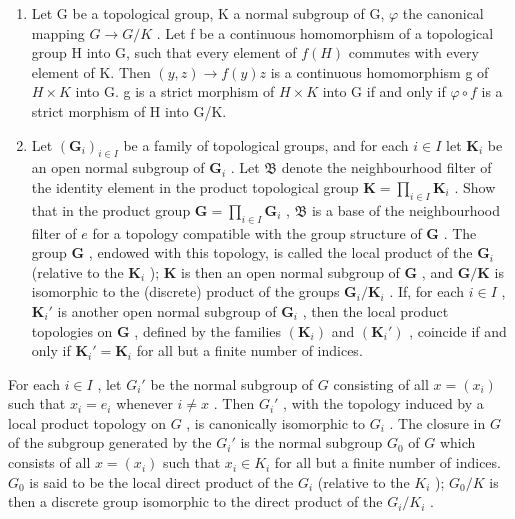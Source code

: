 \begin{enumerate}
\def\labelenumi{\arabic{enumi})}
\setcounter{enumi}{24}
\item
  Let G be a topological group, K a normal subgroup of G, \(\varphi\) the canonical mapping \(G \rightarrow G/K\) . Let f be a continuous homomorphism of a topological group H into G, such that every element of \(f(H)\) commutes with every element of K. Then \((y, z) \rightarrow f(y)z\) is a continuous homomorphism g of \(H \times K\) into G. g is a strict morphism of \(H \times K\) into G if and only if \(\varphi \circ f\) is a strict morphism of H into G/K.
\item
  Let \((\mathbf{G}_i)_{i\in I}\) be a family of topological groups, and for each \(i\in I\) let \(\mathbf{K}_i\) be an open normal subgroup of \(\mathbf{G}_i\) . Let \(\mathfrak{B}\) denote the neighbourhood filter of the identity element in the product topological group \(\mathbf{K} = \prod_{i\in I}\mathbf{K}_i\) . Show that in the product group \(\mathbf{G} = \prod_{i\in I}\mathbf{G}_i\) , \(\mathfrak{B}\) is a base of the neighbourhood filter of \(e\) for a topology compatible with the group structure of \(\mathbf{G}\) . The group \(\mathbf{G}\) , endowed with this topology, is called the local product of the \(\mathbf{G}_i\) (relative to the \(\mathbf{K}_i\) ); \(\mathbf{K}\) is then an open normal subgroup of \(\mathbf{G}\) , and \(\mathbf{G} / \mathbf{K}\) is isomorphic to the (discrete) product of the groups \(\mathbf{G}_i / \mathbf{K}_i\) . If, for each \(i\in I\) , \(\mathbf{K}_i'\) is another open normal subgroup of \(\mathbf{G}_i\) , then the local product topologies on \(\mathbf{G}\) , defined by the families \((\mathbf{K}_i)\) and \((\mathbf{K}_i')\) , coincide if and only if \(\mathbf{K}_i' = \mathbf{K}_i\) for all but a finite number of indices.
\end{enumerate}

For each \(i \in I\) , let \(G_i'\) be the normal subgroup of \(G\) consisting of all \(x = (x_i)\) such that \(x_i = e_i\) whenever \(i \neq x\) . Then \(G_i'\) , with the topology induced by a local product topology on \(G\) , is canonically isomorphic to \(G_i\) . The closure in \(G\) of the subgroup generated by the \(G_i'\) is the normal subgroup \(G_0\) of \(G\) which consists of all \(x = (x_i)\) such that \(x_i \in K_i\) for all but a finite number of indices. \(G_0\) is said to be the local direct product of the \(G_i\) (relative to the \(K_i\) ); \(G_0 / K\) is then a discrete group isomorphic to the direct product of the \(G_i / K_i\) .

